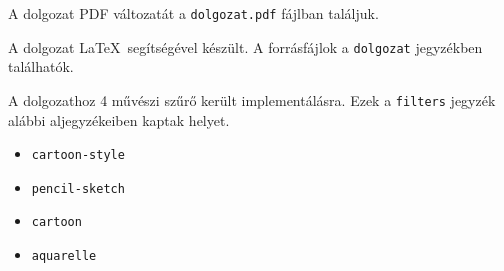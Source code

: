 

A dolgozat PDF változatát a \texttt{dolgozat.pdf} fájlban találjuk.

A dolgozat \LaTeX\ segítségével készült. A forrásfájlok a \texttt{dolgozat} jegyzékben találhatók.

A dolgozathoz 4 művészi szűrő került implementálásra. Ezek a \texttt{filters} jegyzék alábbi aljegyzékeiben kaptak helyet.
\begin{itemize}
\item \texttt{cartoon-style}
\item \texttt{pencil-sketch}
\item \texttt{cartoon}
\item \texttt{aquarelle}
\end{itemize}
